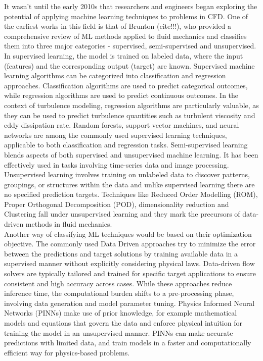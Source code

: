It wasn't until the early 2010s that researchers and engineers began exploring the potential of applying machine learning techniques to problems in CFD. One of the earliest works in this field is that of Brunton (cite!!!), who provided a comprehensive review of ML methods applied to fluid mechanics and classifies them into three major categories - supervised, semi-supervised and unsupervised. In supervised learning, the model is trained on labeled data, where the input (features) and the corresponding output (target) are known. Supervised machine learning algorithms can be categorized into classification and regression approaches. Classification algorithms are used to predict categorical outcomes, while regression algorithms are used to predict continuous outcomes. In the context of turbulence modeling, regression algorithms are particularly valuable, as they can be used to predict turbulence quantities such as turbulent viscosity and eddy dissipation rate. Random forests, support vector machines, and neural networks are among the commonly used supervised learning techniques, applicable to both classification and regression tasks. Semi-supervised learning blends aspects of both supervised and unsupervised machine learning. It has been effectively used in tasks involving time-series data and image processing. Unsupervised learning involves training on unlabeled data to discover patterns, groupings, or structures within the data and unlike supervised learning there are no specified prediction targets. Techniques like Reduced Order Modelling (ROM), Proper Orthogonal Decomposition (POD), dimensionality reduction and Clustering fall under unsupervised learning and they mark the precursors of data-driven methods in fluid mechanics. \\
Another way of classifying ML techniques would be based on their optimization objective. The commonly used Data Driven approaches try to minimize the error between the predictions and target solutions by training available data in a supervised manner without explicitly considering physical laws. Data-driven flow solvers are typically tailored and trained for specific target applications to ensure consistent and high accuracy across cases. While these approaches reduce inference time, the computational burden shifts to a pre-processing phase, involving data generation and model parameter tuning. Physics Informed Neural Networks (PINNs) make use of prior knowledge, for example mathematical models and equations that govern the data and enforce physical intuition for training the model in an unsupervised manner. PINNs can make accurate predictions with limited data, and train models in a faster and computationally efficient way for physics-based problems. \\
